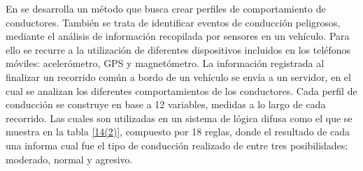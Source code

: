 En \cite{6728289} se desarrolla un método que busca crear perfiles de comportamiento de conductores. 
También se trata de identificar eventos de conducción peligrosos, mediante el análisis de información recopilada por sensores en un vehículo. 
Para ello se recurre a la utilización de diferentes dispositivos incluidos en los teléfonos móviles: acelerómetro, GPS y magnetómetro. 
La información registrada al finalizar un recorrido común a bordo de un vehículo se envía a un servidor, en el cual se analizan los diferentes comportamientos de los conductores. 
Cada perfil de conducción se construye en base a 12 variables, medidas a lo largo de cada recorrido. 
Las cuales son utilizadas en un sistema de lógica difusa como el que se muestra en la tabla \ref{14(2)}, compuesto por 18 reglas, donde el resultado de cada una informa cual fue el tipo de conducción realizado de entre tres posibilidades: moderado, normal y agresivo. 

